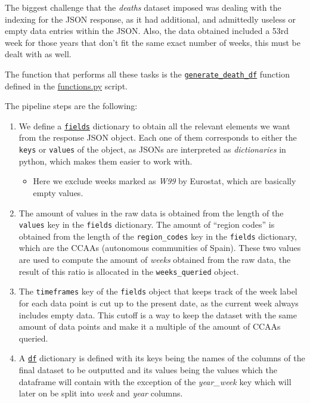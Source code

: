 \documentclass[
  a4paper]{article}
\providecommand{\tightlist}{%
  \setlength{\itemsep}{0pt}\setlength{\parskip}{0pt}}
\begin{document}
The biggest challenge that the \emph{deaths} dataset imposed was dealing
with the indexing for the JSON response, as it had additional, and
admittedly useless or empty data entries within the JSON. Also, the data
obtained included a 53rd week for those years that don't fit the same
exact number of weeks, this must be dealt with as well.

The function that performs all these tasks is the
\href{https://github.com/dreth/tfm_uc3m/blob/report_ref/api/functions.py\#L84}{\texttt{generate\_death\_df}}
function defined in the
\href{https://github.com/dreth/tfm_uc3m/blob/main/api/functions.py}{functions.py}
script.

The pipeline steps are the following:

\begin{enumerate}
\def\labelenumi{\arabic{enumi}.}
\item
  We define a
  \href{https://github.com/dreth/tfm_uc3m/blob/report_ref/api/functions.py\#L88}{\texttt{fields}}
  dictionary to obtain all the relevant elements we want from the
  response JSON object. Each one of them corresponds to either the
  \texttt{keys} or \texttt{values} of the object, as JSONs are
  interpreted as \emph{dictionaries} in python, which makes them easier
  to work with.

  \begin{itemize}
  \tightlist
  \item
    Here we exclude weeks marked as \emph{W99} by Eurostat, which are
    basically empty values.
  \end{itemize}
\item
  The amount of values in the raw data is obtained from the length of
  the \texttt{values} key in the \texttt{fields} dictionary. The amount
  of ``region codes'' is obtained from the length of the
  \texttt{region\_codes} key in the \texttt{fields} dictionary, which
  are the CCAAs (autonomous communities of Spain). These two values are
  used to compute the amount of \emph{weeks} obtained from the raw data,
  the result of this ratio is allocated in the \texttt{weeks\_queried}
  object.
\item
  The \texttt{timeframes} key of the \texttt{fields} object that keeps
  track of the week label for each data point is cut up to the present
  date, as the current week always includes empty data. This cutoff is a
  way to keep the dataset with the same amount of data points and make
  it a multiple of the amount of CCAAs queried.
\item
  A
  \href{https://github.com/dreth/tfm_uc3m/blob/report_ref/api/functions.py\#L107}{\texttt{df}}
  dictionary is defined with its keys being the names of the columns of
  the final dataset to be outputted and its values being the values
  which the dataframe will contain with the exception of the
  \emph{year\_week} key which will later on be split into \emph{week}
  and \emph{year} columns.


\end{enumerate}
\end{document}

